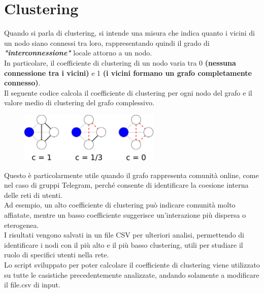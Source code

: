 \documentclass[12pt]{article}
\begin{document}
	\section{Clustering}
	Quando si parla di clustering, si intende una misura che indica quanto i vicini di un nodo siano connessi tra loro, rappresentando quindi il grado di \textbf{\textit{"interconnessione"}} locale attorno a un nodo.\\
	In particolare, il coefficiente di clustering di un nodo varia tra 0 \textbf{(nessuna connessione tra i vicini)} e 1 \textbf{(i vicini formano un grafo completamente connesso)}.\\
	Il seguente codice calcola il coefficiente di clustering per ogni nodo del grafo e il valore medio di clustering del grafo complessivo.
	\begin{figure}[H]
		\centering
		\includegraphics[width=0.6\textwidth]{immagini/clustering}
	\end{figure}
	Questo è particolarmente utile quando il grafo rappresenta comunità online, come nel caso di gruppi Telegram, perché consente di identificare la coesione interna delle reti di utenti.\\
	Ad esempio, un alto coefficiente di clustering può indicare comunità molto affiatate, mentre un basso coefficiente suggerisce un'interazione più dispersa o eterogenea.\\
	I risultati vengono salvati in un file CSV per ulteriori analisi, permettendo di identificare i nodi con il più alto e il più basso clustering, utili per studiare il ruolo di specifici utenti nella rete.\\
	Lo script sviluppato per poter calcolare il coefficiente di clustering viene utilizzato su tutte le casistiche precedentemente analizzate, andando solamente a modificare il file.csv di input.
\end{document}
